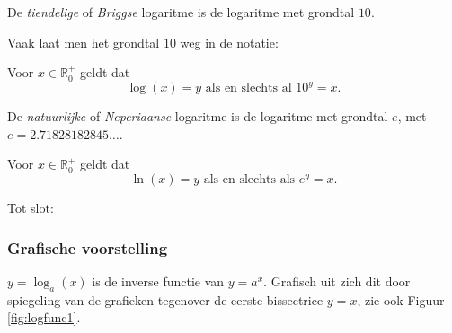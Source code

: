 De \emph{tiendelige} of \emph{Briggse} logaritme is de logaritme met grondtal $10$.

Vaak laat men het grondtal $10$ weg in de notatie:

\begin{definitie}
	Voor $x \in \mathbb{R}_0^+$ geldt dat
	\begin{equation*}
	\log(x)=y \text{ als en slechts al } 10^y=x.
	\end{equation*}

\end{definitie}

De \emph{natuurlijke} of \emph{Neperiaanse} logaritme is de logaritme met grondtal $e$, met $e=2.71828182845\ldots$.

\begin{definitie}
	Voor $x \in \mathbb{R}_0^+$ geldt dat
	\begin{equation*}
	\ln(x)=y \text{ als en slechts als } e^y=x.
	\end{equation*}
\end{definitie}

Tot slot:





\subsubsection{Grafische voorstelling}

$y=\log_{a}(x)$ is de inverse functie van $y=a^x$. Grafisch uit zich dit door spiegeling van de grafieken tegenover de eerste bissectrice $y=x$, zie ook Figuur \ref{fig:logfunc1}.

